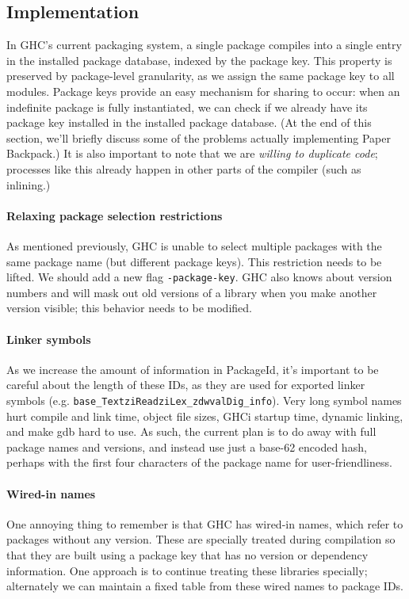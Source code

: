 \documentclass{article}
\begin{document}
\subsection{Implementation}

In GHC's current packaging system, a single package compiles into a
single entry in the installed package database, indexed by the package
key.  This property is preserved by package-level granularity, as we
assign the same package key to all modules.  Package keys provide an
easy mechanism for sharing to occur: when an indefinite package is fully
instantiated, we can check if we already have its package key installed
in the installed package database.  (At the end of this section, we'll
briefly discuss some of the problems actually implementing Paper Backpack.)
It is also important to note that we are \emph{willing to duplicate code};
processes like this already happen in other parts of the compiler
(such as inlining.)

\paragraph{Relaxing package selection restrictions}  As mentioned
previously, GHC is unable to select multiple packages with the same
package name (but different package keys).  This restriction needs to be
lifted.  We should add a new flag \verb|-package-key|.  GHC also knows
about version numbers and will mask out old versions of a library when
you make another version visible; this behavior needs to be modified.

\paragraph{Linker symbols} As we increase the amount of information in
PackageId, it's important to be careful about the length of these IDs,
as they are used for exported linker symbols (e.g.
\verb|base_TextziReadziLex_zdwvalDig_info|).  Very long symbol names
hurt compile and link time, object file sizes, GHCi startup time,
dynamic linking, and make gdb hard to use.  As such, the current plan is
to do away with full package names and versions, and instead use just a
base-62 encoded hash, perhaps with the first four characters of the package
name for user-friendliness.

\paragraph{Wired-in names} One annoying thing to remember is that GHC
has wired-in names, which refer to packages without any version.  These
are specially treated during compilation so that they are built using
a package key that has no version or dependency information.  One approach
is to continue treating these libraries specially; alternately we can
maintain a fixed table from these wired names to
package IDs.
\end{document}
